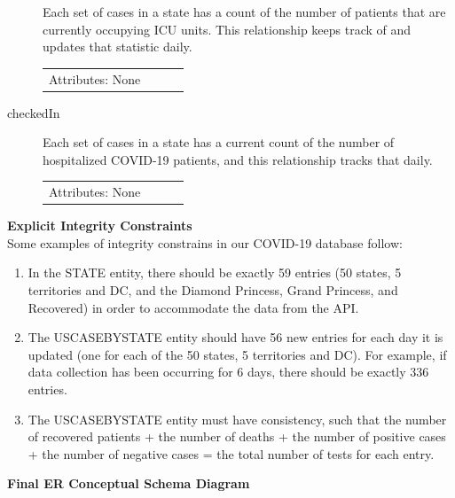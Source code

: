 \documentclass[11pt]{article}
\begin{document}
\begin{description}
\noindent
Each set of cases in a state has a count of the number of patients that are currently occupying ICU units. This relationship keeps track of and updates that statistic daily.

\begin{tabular}{lllc}
    Attributes: None \\
\end{tabular}

\item [checkedIn]

\noindent
Each set of cases in a state has a current count of the number of hospitalized COVID-19 patients, and this relationship tracks that daily.

\begin{tabular}{lllc}
    Attributes: None \\
\end{tabular}

\end{description}

\noindent
\textbf{Explicit Integrity Constraints} \\

\noindent
Some examples of integrity constrains in our COVID-19 database follow:

\begin{enumerate}
    \item In the STATE entity, there should be exactly 59 entries (50 states, 5 territories and DC, and the Diamond Princess, Grand Princess, and Recovered) in order to accommodate the data from the API.
    \item The USCASEBYSTATE entity should have 56 new entries for each day it is updated (one for each of the 50 states, 5 territories and DC). For example, if data collection has been occurring for 6 days, there should be exactly 336 entries.
    \item The USCASEBYSTATE entity must have consistency, such that the number of recovered patients + the number of deaths + the number of positive cases + the number of negative cases = the total number of tests for each entry.
\end{enumerate}

\pagebreak

\noindent
\textbf{Final ER Conceptual Schema Diagram}
\end{document}
